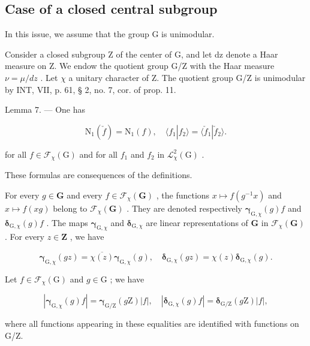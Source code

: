 \subsection{Case of a closed central subgroup}

In this issue, we assume that the group G is unimodular.

 Consider a closed subgroup Z of the center of G, and let dz denote a Haar measure on Z. We endow the quotient group G/Z with the Haar measure \(\nu = \mu/dz\) . Let \(\chi\) a unitary character of Z. The quotient group G/Z is unimodular by INT, VII, p. 61, § 2, no. 7, cor. of prop. 11.

Lemma 7. --- One has

\[
\mathrm{N} _ {1} (\check {f}) = \mathrm{N} _ {1} (f), \quad \langle f _ {1} | f _ {2} \rangle = \langle \check {f} _ {1} | \check {f} _ {2} \rangle .\tag{6}
\]

for all \(f \in \mathcal{F}_{\chi}(\mathrm{G})\) and for all \(f_1\) and \(f_2\) in \(\mathcal{L}_{\chi}^{2}(\mathrm{G})\) .

These formulas are consequences of the definitions.

 For every \(g \in \mathbf{G}\) and every \(f \in \mathcal{F}_{\chi}(\mathbf{G})\) , the functions \(x \mapsto f(g^{-1}x)\) and \(x \mapsto f(xg)\) belong to \(\mathcal{F}_{\chi}(\mathbf{G})\) . They are denoted respectively \(\boldsymbol{\gamma}_{\mathrm{G},\chi}(g)f\) and \(\boldsymbol{\delta}_{\mathrm{G},\chi}(g)f\) . The maps \(\boldsymbol{\gamma}_{\mathrm{G},\chi}\) and \(\boldsymbol{\delta}_{\mathrm{G},\chi}\) are linear representations of \(\mathbf{G}\) in \(\mathcal{F}_{\chi}(\mathbf{G})\) . For every \(z \in \mathbf{Z}\) , we have

\[
\boldsymbol {\gamma} _ {\mathrm{G}, \chi} (g z) = \overline {{\chi (z)}} \boldsymbol {\gamma} _ {\mathrm{G}, \chi} (g), \quad \boldsymbol {\delta} _ {\mathrm{G}, \chi} (g z) = \chi (z) \boldsymbol {\delta} _ {\mathrm{G}, \chi} (g).\tag{7}
\]

Let \(f\in \mathcal{F}_{\chi}(\mathrm{G})\) and \(g\in \mathrm{G}\) ; we have

\[
| \boldsymbol {\gamma} _ {\mathrm{G}, \chi} (g) f | = \boldsymbol {\gamma} _ {\mathrm{G} / \mathrm{Z}} (g \mathrm{Z}) | f |, \quad | \boldsymbol {\delta} _ {\mathrm{G}, \chi} (g) f | = \boldsymbol {\delta} _ {\mathrm{G} / \mathrm{Z}} (g \mathrm{Z}) | f |,\tag{8}
\]

where all functions appearing in these equalities are identified with functions on G/Z.

